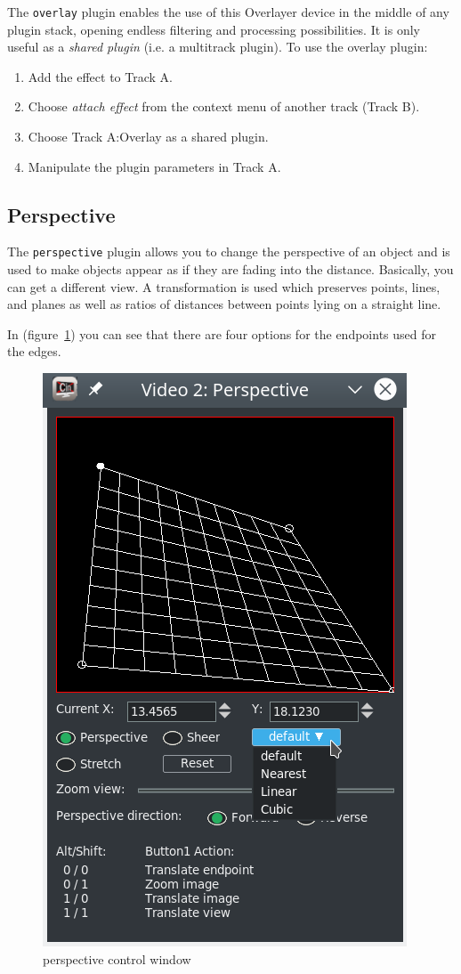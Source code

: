 The \texttt{overlay} plugin enables the use of this Overlayer device in the middle of any plugin stack, opening endless filtering and processing possibilities. It is only useful as a \textit{shared plugin} (i.e. a multitrack plugin). To use the overlay plugin:

\begin{enumerate}
    \item Add the effect to Track A.
    \item Choose \textit{attach effect} from the context menu of another track (Track B).
    \item Choose Track A:Overlay as a shared plugin.
    \item Manipulate the plugin parameters in Track A.
\end{enumerate}

\subsection{Perspective}%
\label{sub:perspective}

The \texttt{perspective} plugin allows you to change the perspective of an object and is used to make objects appear as if they are fading into the distance. Basically, you can get a different view. A transformation is used which preserves points, lines, and planes as well as ratios of distances between points lying on a straight line.

In (figure~\ref{fig:perspective}) you can see that there are four options for the endpoints used for the edges.

\begin{figure}[htpb]
    \centering
    \includegraphics[width=0.4\linewidth]{images/perspective.png}
    \caption{perspective control window}
    \label{fig:perspective}
\end{figure}

